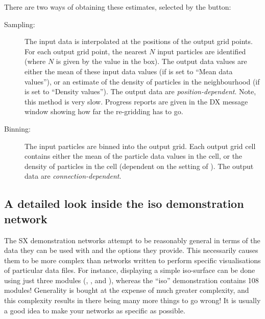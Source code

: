 \begin{description}
\begin{itemize}
\end{itemize}

There are two ways of obtaining these estimates, selected by the
 button:

\begin{description}

\item [Sampling:]
The input data is interpolated at the positions of the output grid
points. For each output grid point, the nearest $N$ input particles are
identified (where $N$ is given by the value in the  box). The output data values are either the mean of
these input data values (if  is set to ``Mean data
values''), or an estimate of the density of particles in the neighbourhood
(if  is set to ``Density values''). The output data are
{\em position-dependent}. Note, this method is very slow. Progress reports
are given in the DX message window showing how far the re-gridding has to
go.

\item [Binning:]
The input particles are binned into the output grid. Each output grid
cell contains either the mean of the particle data values in the cell, or
the density of particles in the cell (dependent on the setting of
). The output data are {\em connection-dependent}.

\end{description}

\end{description}

\subsection{A detailed look inside the {\bf iso} demonstration network}
The SX demonstration networks attempt to be reasonably general in terms of
the data they can be used with and the options they provide. This
necessarily causes them to be more complex than networks written to
perform specific visualisations of particular data files. For instance,
displaying a simple iso-surface can be done using just three modules
(, , and ), whereas the ``iso''
demonstration contains 108 modules! Generality is bought at the expense
of much greater complexity, and this complexity results in there being
many more things to go wrong! It is usually a good idea to make your
networks as specific as possible.

